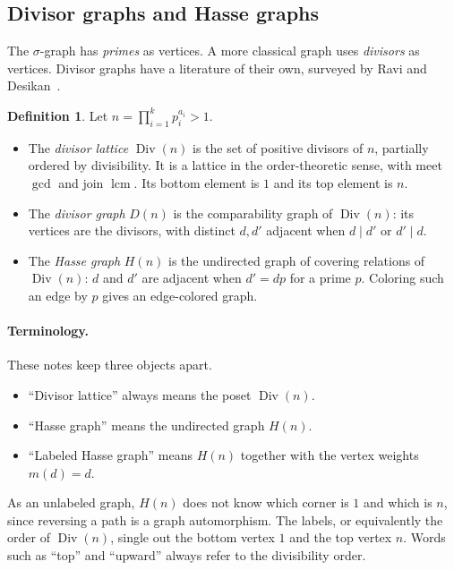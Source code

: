 \documentclass[11pt]{article}
\theoremstyle{definition}
\newtheorem{definition}[theorem]{Definition}
\theoremstyle{remark}
\begin{document}
\subsection{Divisor graphs and Hasse graphs}\label{sec:divisorgraphs}

The $\sigma$-graph has \emph{primes} as vertices.  A more classical graph
uses \emph{divisors} as vertices.  Divisor graphs have a literature of their
own, surveyed by Ravi and Desikan~\cite{RaviDesikan}.

\begin{definition}
Let $n=\prod_{i=1}^k p_i^{a_i}>1$.
\begin{itemize}[leftmargin=1.5em]
\item The \emph{divisor lattice} $\operatorname{Div}(n)$ is the set of
  positive divisors of $n$, partially ordered by divisibility.  It is a
  lattice in the order-theoretic sense, with meet $\gcd$ and join
  $\operatorname{lcm}$.  Its bottom element is $1$ and its top element is $n$.
\item The \emph{divisor graph} $D(n)$ is the comparability graph of
  $\operatorname{Div}(n)$: its vertices are the divisors, with distinct
  $d,d'$ adjacent when $d\mid d'$ or $d'\mid d$.
\item The \emph{Hasse graph} $H(n)$ is the undirected graph of covering
  relations of $\operatorname{Div}(n)$: $d$ and $d'$ are adjacent when
  $d'=dp$ for a prime $p$.  Coloring such an edge by $p$ gives an
  edge-colored graph.
\end{itemize}
\end{definition}

\paragraph{Terminology.}
These notes keep three objects apart.
\begin{itemize}[leftmargin=1.5em]
\item ``Divisor lattice'' always means the poset $\operatorname{Div}(n)$.
\item ``Hasse graph'' means the undirected graph $H(n)$.
\item ``Labeled Hasse graph'' means $H(n)$ together with the vertex weights
  $m(d)=d$.
\end{itemize}
As an unlabeled graph, $H(n)$ does not know which corner is $1$ and which is
$n$, since reversing a path is a graph automorphism.  The labels, or
equivalently the order of $\operatorname{Div}(n)$, single out the bottom
vertex $1$ and the top vertex $n$.  Words such as ``top'' and ``upward''
always refer to the divisibility order.
\end{document}
